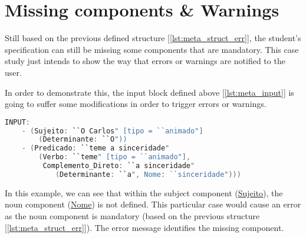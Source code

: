 %
%
%
%
%

\section{Missing components \& Warnings}
Still based on the previous defined structure [\ref{lst:meta_struct_err}], the student's specification can still be missing some components that are mandatory. This case 
study just intends to show the way that errors or warnings are notified to the user.

In order to demonstrate this, the input block defined above [\ref{lst:meta_input}] is going to suffer some modifications in order to trigger errors or warnings.

\begin{center}
\begin{minipage}{13cm}
\begin{lstlisting}[language=java, basicstyle=\small, label={lst:meta_input_missing_comp}, caption=Example of the students parsing with missing component]
INPUT:
    - (Sujeito: ``O Carlos" [tipo = ``animado"]
        (Determinante: ``O"))
    - (Predicado: ``teme a sinceridade" 
        (Verbo: ``teme" [tipo = ``animado"], 
         Complemento_Direto: ``a sinceridade" 
            (Determinante: ``a", Nome: ``sinceridade")))
\end{lstlisting}
\end{minipage}
\end{center}

In this example, we can see that within the subject component (\underline{Sujeito}), the noun component (\underline{Nome}) is not defined. This particular case would
cause an error as the noun component is mandatory (based on the previous structure [\ref{lst:meta_struct_err}]). The error message identifies the missing component.

